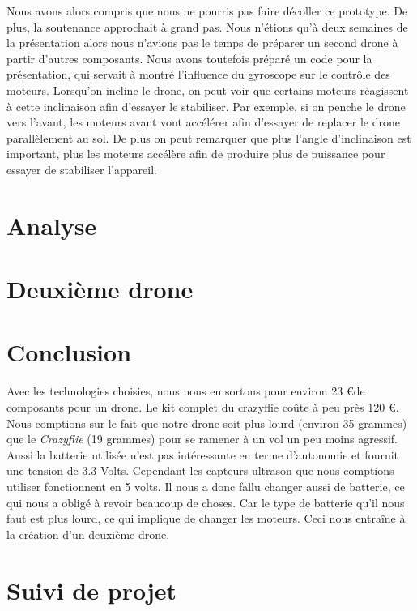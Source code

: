 \documentclass[a4paper,10pt]{report}
\begin{document}
	  Nous avons alors compris que nous ne pourris pas faire décoller ce 
prototype. De plus, la soutenance approchait à grand pas. Nous n'étions qu'à 
deux semaines de la présentation alors nous n'avions pas le temps de préparer un 
second drone à partir d'autres composants. Nous avons toutefois préparé un code 
pour la présentation, qui servait à montré l'influence du gyroscope sur le 
contrôle des moteurs. Lorsqu'on incline le drone, on peut voir que certains 
moteurs réagissent à cette inclinaison afin d'essayer le stabiliser. Par 
exemple, si on penche le drone vers l'avant, les moteurs avant vont accélérer 
afin d'essayer de replacer le drone parallèlement au sol. De plus on peut 
remarquer que plus l'angle d'inclinaison est important, plus les moteurs 
accélère afin de produire plus de puissance pour essayer de stabiliser 
l'appareil.

  \chapter{Analyse}
  
  
  \chapter{Deuxième drone}
  
  \chapter{Conclusion}
  	   Avec les technologies choisies, nous nous en sortons pour environ 23 
\euro \space de composants pour un drone. Le kit complet du crazyflie coûte à 
peu près 120 \euro. Nous comptions sur le fait que notre drone soit plus lourd 
(environ 35 grammes) que le \textit{Crazyflie} (19 grammes) pour se ramener à 
un vol un peu moins agressif. Aussi la batterie utilisée n'est pas
      intéressante en terme d'autonomie et fournit une tension de 3.3 Volts. 
Cependant les capteurs ultrason que nous comptions utiliser
      fonctionnent en 5 volts. Il nous a donc fallu changer aussi de batterie, 
ce qui nous a obligé à revoir beaucoup de choses. Car le type
      de batterie qu'il nous faut est plus lourd, ce qui implique de changer 
les 
moteurs. Ceci nous entraîne à la création d'un deuxième
      drone.
  
  \appendix
    \chapter{Suivi de projet}
\end{document}
